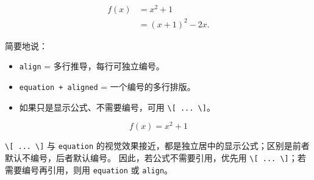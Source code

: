 \begin{equation}\label{eq:equation-aligned}
\begin{aligned}
f(x) &= x^2 + 1\\
     &= (x+1)^2 - 2x.
\end{aligned}
\end{equation}

简要地说：
\begin{itemize}
    \item \texttt{align} = 多行推导，每行可独立编号。
    \item \texttt{equation + aligned} = 一个编号的多行排版。
    \item 如果只是显示公式、不需要编号，可用 \texttt{\textbackslash[ ... \textbackslash ]}。
\end{itemize}

\[
f(x) = x^2 + 1
\]

\texttt{\textbackslash[ ... \textbackslash ]} 与 \texttt{equation} 的视觉效果接近，都是独立居中的显示公式；区别是前者默认不编号，后者默认编号。
因此，若公式不需要引用，优先用 \texttt{\textbackslash[ ... \textbackslash ]}；若需要编号再引用，则用 \texttt{equation} 或 \texttt{align}。

